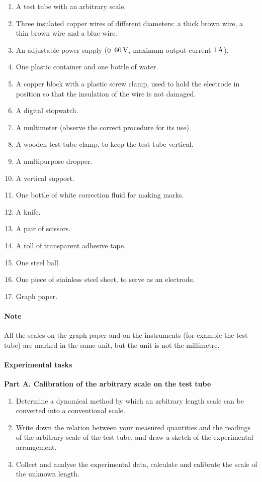 \begin{enumerate}[label=(\arabic*)]
\item A test tube with an arbitrary scale.
\item Three insulated copper wires of different diameters: a thick brown wire, a thin brown wire and a blue wire.
\item An adjustable power supply ($0$--$60\,\mathrm{V}$, maximum output current $1\,\mathrm{A}$).
\item One plastic container and one bottle of water.
\item A copper block with a plastic screw clamp, used to hold the electrode in position so that the insulation of the wire is not damaged.
\item A digital stopwatch.
\item A multimeter (observe the correct procedure for its use).
\item A wooden test-tube clamp, to keep the test tube vertical.
\item A multipurpose dropper.
\item A vertical support.
\item One bottle of white correction fluid for making marks.
\item A knife.
\item A pair of scissors.
\item A roll of transparent adhesive tape.
\item One steel ball.
\item One piece of stainless steel sheet, to serve as an electrode.
\item Graph paper.
\end{enumerate}

\paragraph{Note}

All the scales on the graph paper and on the instruments (for example the test tube) are marked in the same unit, but the unit is not the millimetre.

\paragraph{Experimental tasks}

\textbf{Part A. Calibration of the arbitrary scale on the test tube}

\begin{enumerate}[label=(\arabic*)]
\item Determine a dynamical method by which an arbitrary length scale can be converted into a conventional scale.
\item Write down the relation between your measured quantities and the readings of the arbitrary scale of the test tube, and draw a sketch of the experimental arrangement.
\item Collect and analyse the experimental data, calculate and calibrate the scale of the unknown length.
\end{enumerate}

